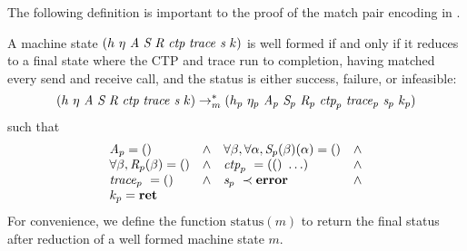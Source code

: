 The following definition is important to the proof of the match pair encoding in .
\begin{definition}
A machine state $(h\ \eta\ \aidmap\ \epsnd\ \eprcv\ \cfgnt{ctp}\ \trace\ \status\ k)$ is well formed if and only if it reduces to a final
state where the CTP and trace run to completion, having matched every send and receive call, and the status is either success,
failure, or infeasible: 
\[(h\ \eta\ \aidmap\ \epsnd\ \eprcv\ \cfgnt{ctp}\ \trace\ \status\ k) \reduceK{m} (h_p\ \eta_p\ \aidmap_p\ \epsnd_p\ \eprcv_p\ \cfgnt{ctp}_p\ \trace_p\ \status_p\ k_p)\]
such that
\[
\begin{array}{llll}
\textit{A}_p = ()                    & \wedge & \forall \beta, \forall \alpha, \textit{S}_p(\beta)(\alpha) = () & \wedge \\
\forall \beta, \textit{R}_p(\beta) = () & \wedge & \emph{ctp}_p\ = (()\ \ldots)                         & \wedge \\
\mathit{trace}_p\  = ()                   & \wedge & \textit{s}_p\ \prec \textbf{error}                         & \wedge \\
k_p = \textbf{ret}                  &        &                                                       &
\end{array}
\]
For convenience, we define the function $\mathrm{status}(m)$ to return the final status after reduction of a well formed machine state $m$.
\end{definition}

